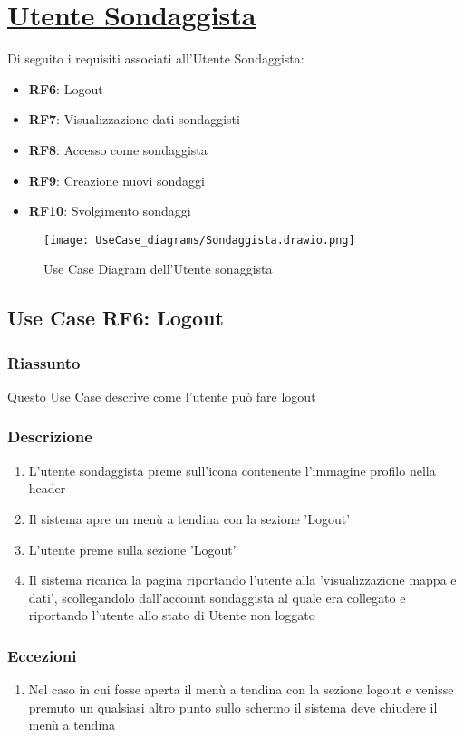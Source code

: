 \section{\underline{Utente Sondaggista}}
    Di seguito i requisiti associati all'Utente Sondaggista:
    \begin{itemize}
        \item \textbf{RF6}: Logout
        \item \textbf{RF7}: Visualizzazione dati sondaggisti
        \item \textbf{RF8}: Accesso come sondaggista
        \item \textbf{RF9}: Creazione nuovi sondaggi
        \item \textbf{RF10}: Svolgimento sondaggi
    \end{itemize}
    \begin{figure}[H]
        \centering
        \texttt{[image: UseCase\_diagrams/Sondaggista.drawio.png]}
        \caption{Use Case Diagram dell'Utente sonaggista}
    \end{figure}

    \subsection{Use Case RF6: Logout}
        \subsubsection{Riassunto}
            Questo Use Case descrive come l'utente può fare logout
        \subsubsection{Descrizione}
            \begin{enumerate}
                \item L'utente sondaggista preme sull'icona contenente l'immagine profilo nella header
                \item Il sistema apre un menù a tendina con la sezione 'Logout'
                \item L'utente preme sulla sezione 'Logout'
                \item Il sistema ricarica la pagina riportando l'utente alla 'visualizzazione mappa e dati', scollegandolo dall'account sondaggista al quale era collegato e riportando l'utente allo stato di Utente non loggato
            \end{enumerate}
        \subsubsection{Eccezioni}
            \begin{enumerate}
                \item Nel caso in cui fosse aperta il menù a tendina con la sezione logout e venisse premuto un qualsiasi altro punto sullo schermo il sistema deve chiudere il menù a tendina
            \end{enumerate}
